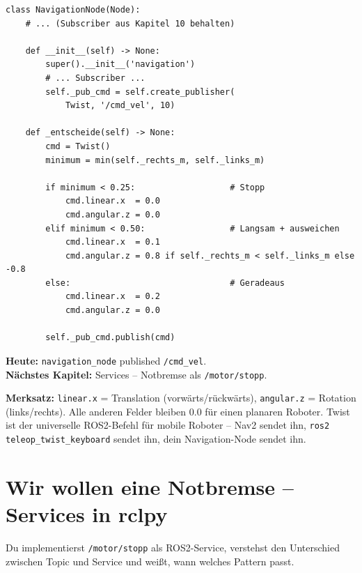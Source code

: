 \begin{lstlisting}
class NavigationNode(Node):
    # ... (Subscriber aus Kapitel 10 behalten)

    def __init__(self) -> None:
        super().__init__('navigation')
        # ... Subscriber ...
        self._pub_cmd = self.create_publisher(
            Twist, '/cmd_vel', 10)

    def _entscheide(self) -> None:
        cmd = Twist()
        minimum = min(self._rechts_m, self._links_m)

        if minimum < 0.25:                   # Stopp
            cmd.linear.x  = 0.0
            cmd.angular.z = 0.0
        elif minimum < 0.50:                 # Langsam + ausweichen
            cmd.linear.x  = 0.1
            cmd.angular.z = 0.8 if self._rechts_m < self._links_m else -0.8
        else:                                # Geradeaus
            cmd.linear.x  = 0.2
            cmd.angular.z = 0.0

        self._pub_cmd.publish(cmd)
\end{lstlisting}

\begin{projektBox}
\textbf{Heute:} \texttt{navigation\_node} published \texttt{/cmd\_vel}.\\
\textbf{Nächstes Kapitel:} Services -- Notbremse als \texttt{/motor/stopp}.
\end{projektBox}

\begin{merksatzBox}
\textbf{Merksatz:} \texttt{linear.x} = Translation (vorwärts/rückwärts),
\texttt{angular.z} = Rotation (links/rechts).
Alle anderen Felder bleiben 0.0 für einen planaren Roboter.
Twist ist der universelle ROS2-Befehl für mobile Roboter --
Nav2 sendet ihn, \texttt{ros2 teleop\_twist\_keyboard} sendet ihn,
dein Navigation-Node sendet ihn.
\end{merksatzBox}


\chapter{Wir wollen eine Notbremse – Services in rclpy}

\begin{lernziele}
Du implementierst \texttt{/motor/stopp} als ROS2-Service,
verstehst den Unterschied zwischen Topic und Service
und weißt, wann welches Pattern passt.
\end{lernziele}

